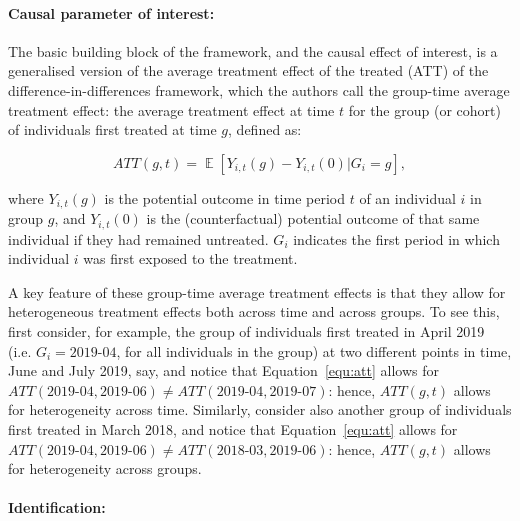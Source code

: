 \paragraph{Causal parameter of interest:}%
\label{par:causal_parameter_of_interest_}

The basic building block of the framework, and the causal effect of interest,
is a generalised version of the average treatment effect of the treated (ATT)
of the difference-in-differences framework, which the authors call the
group-time average treatment effect: the average treatment effect at time $t$
for the group (or cohort) of individuals first treated at time $g$, defined as:

\begin{equation}
    \label{equ:att}
    ATT(g,t) = \mathop{\mathbb{E}}[Y_{i,t}(g) - Y_{i,t}(0)|G_i =
    g],
\end{equation}

\noindent where $Y_{i,t}(g)$ is the potential outcome in time period $t$ of an individual
$i$ in group $g$, and $Y_{i,t}(0)$ is the (counterfactual) potential outcome of that same
individual if they had remained untreated. $G_i$ indicates the first period in
which individual $i$ was first exposed to the treatment.

A key feature of these group-time average treatment effects is that they allow
for heterogeneous treatment effects both across time and across groups. To see
this, first consider, for example, the group of individuals first treated in
April 2019 (i.e. $G_i = \textit{2019-04}$, for all individuals in the group) at
two different points in time, June and July 2019, say, and notice that
Equation~\ref{equ:att} allows for $ATT(\textit{2019-04}, \textit{2019-06}) \neq
ATT(\textit{2019-04}, \textit{2019-07})$: hence, $ATT(g,t)$ allows for
heterogeneity across time. Similarly, consider also another group of individuals
first treated in March 2018, and notice that Equation~\ref{equ:att} allows for
$ATT(\textit{2019-04}, \textit{2019-06}) \neq ATT(\textit{2018-03},
\textit{2019-06})$: hence, $ATT(g,t)$ allows for heterogeneity across groups.


\paragraph{Identification:}%
\label{par:identification_}

